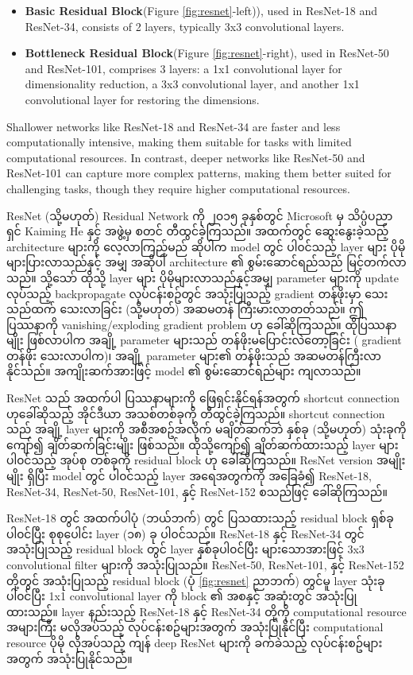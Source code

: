 \begin{itemize}[b]
  \item \textbf{Basic Residual Block}(Figure \ref{fig:resnet}-left)), used in ResNet-18 and ResNet-34, consists of 2 layers, typically 3x3 convolutional layers. 
  \item \textbf{Bottleneck Residual Block}(Figure \ref{fig:resnet}-right), used in ResNet-50 and ResNet-101, comprises 3 layers: a 1x1 convolutional layer for dimensionality reduction, a 3x3 convolutional layer, and another 1x1 convolutional layer for restoring the dimensions. 
\end{itemize}

Shallower networks like ResNet-18 and ResNet-34 are faster and less computationally intensive, making them suitable for tasks with limited computational resources. In contrast, deeper networks like ResNet-50 and ResNet-101 can capture more complex patterns, making them better suited for challenging tasks, though they require higher computational resources.

ResNet (သို့မဟုတ်) Residual Network ကို ၂၀၁၅ ခုနှစ်တွင် Microsoft မှ သိပ္ပံပညာရှင် Kaiming He နှင့် အဖွဲ့မှ စတင် တီထွင်ခဲ့ကြသည်။ အထက်တွင် ဆွေးနွေးခဲ့သည့် architecture များကို လေ့လာကြည့်မည် ဆိုပါက model တွင် ပါ၀င်သည့် layer များ ပိုမို များပြားလာသည်နှင့် အမျှ အဆိုပါ architecture ၏ စွမ်းဆောင်ရည်သည် မြင့်တက်လာသည်။ သို့သော် ထိုသို့ layer များ ပိုမိုများလာသည်နှင့်အမျှ parameter များကို update လုပ်သည့် backpropagate လုပ်ငန်းစဥ်တွင် အသုံးပြုသည့် gradient တန်ဖိုးမှာ သေးသည်ထက် သေးလာခြင်း (သို့မဟုတ်) အဆမတန် ကြီးမားလာတတ်သည်။ ဤ ပြဿနာကို  vanishing/exploding gradient problem ဟု ခေါ်ဆိုကြသည်။ ထိုပြဿနာမျိုး ဖြစ်လာပါက အချို့ parameter များသည် တန်ဖိုးမပြောင်းလဲတော့ခြင်း ( gradient တန်ဖိုး သေးလာပါက)၊  အချို့ parameter များ၏ တန်ဖိုးသည် အဆမတန်ကြီးလာနိုင်သည်။ အကျိုးဆက်အားဖြင့် model ၏ စွမ်းဆောင်ရည်များ ကျလာသည်။ 

ResNet သည် အထက်ပါ ပြဿနာများကို ဖြေရှင်းနိုင်ရန်အတွက်  shortcut connection ဟုခေါ်ဆိုသည့် အိုင်ဒီယာ အသစ်တစ်ခုကို တီထွင်ခဲ့ကြသည်။  shortcut connection သည် အချို့ layer များကို အစီအစဥ်အလိုက် မချိတ်ဆက်ဘဲ နှစ်ခု (သို့မဟုတ်) သုံးခုကို ကျော်၍ ချိတ်ဆက်ခြင်းမျိုး ဖြစ်သည်။ ထိုသို့ကျော်၍ ချိတ်ဆက်ထားသည့် layer များ ပါ၀င်သည့် အုပ်စု တစ်ခုကို residual block ဟု ခေါ်ဆိုကြသည်။ ResNet version အမျိုးမျိုး ရှိပြီး model တွင် ပါ၀င်သည့် layer အရေအတွက်ကို အခြေခံ၍ ResNet-18, ResNet-34, ResNet-50, ResNet-101, နှင့် ResNet-152 စသည်ဖြင့် ခေါ်ဆိုကြသည်။ 

ResNet-18 တွင် အထက်ပါပုံ (ဘယ်ဘက်) တွင် ပြသထားသည့်  residual block ရှစ်ခု ပါ၀င်ပြီး စုစုပေါင်း layer  (၁၈) ခု ပါ၀င်သည်။ ResNet-18 နှင့် ResNet-34 တွင် အသုံးပြုသည့် residual block တွင် layer နှစ်ခုပါ၀င်ပြီး များသောအားဖြင့် 3x3 convolutional filter များကို အသုံးပြုသည်။ ResNet-50, ResNet-101, နှင့် ResNet-152 တို့တွင် အသုံးပြုသည့် residual block (ပုံ \ref{fig:resnet}  ညာဘက်) တွင်မူ layer သုံးခုပါ၀င်ပြီး 1x1 convolutional layer ကို block ၏ အစနှင့် အဆုံးတွင် အသုံးပြုထားသည်။ layer နည်းသည့် ResNet-18 နှင့် ResNet-34 တို့ကို computational resource အများကြီး မလိုအပ်သည့် လုပ်ငန်းစဥ်များအတွက် အသုံးပြုနိုင်ပြီး  computational resource  ပိုမို လိုအပ်သည့် ကျန် deep ResNet များကို ခက်ခဲသည့် လုပ်ငန်းစဥ်များအတွက် အသုံးပြုနိုင်သည်။ 


